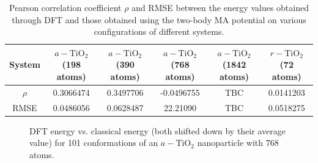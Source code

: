 \documentclass[aps,prb,twocolumn,amsmath,amssymb,superscriptaddress,longbibliography]{revtex4-1}
\begin{document}
\begin{table}[]
\begin{tabular}{c|c|c|c|c|c}
System & $a-\text{TiO}_2$ (198 atoms) & $a-\text{TiO}_2$ (390 atoms) & $a-\text{TiO}_2$ (768 atoms) & $a-\text{TiO}_2$ (1842 atoms) & $r-\text{TiO}_2$ (72 atoms) \\ \hline
$\rho$ & 0.3066474                    & 0.3497706                    & -0.0496755                   & TBC                           & 0.0141203                   \\
RMSE   & 0.0486056                    & 0.0628487                    & 22.21090                     & TBC                           & 0.0518275                   \\
\end{tabular}
\label{stats}
\caption{Pearson correlation coefficient $\rho$ and RMSE between the energy values obtained through DFT and those obtained using the two-body MA potential on various configurations of different systems.}
\end{table}

\begin{figure}[htb]
\caption{DFT energy vs. classical energy (both shifted down by their average value) for 101 conformations of an $a-\text{TiO}_2$ nanoparticle with 768 atoms.}
\label{nnp_768}
\end{figure}
\end{document}
